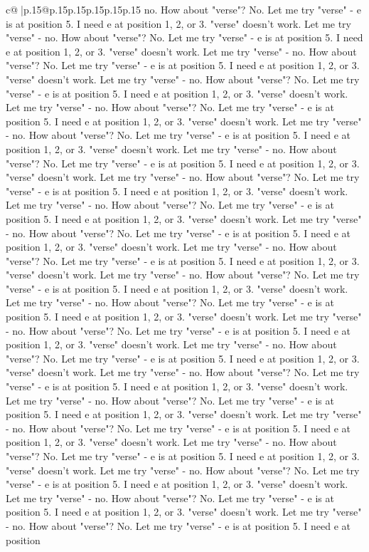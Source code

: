 \documentclass{article}
\begin{document}
{\begin{supertabular}{c@{$\;$}|p{.15\linewidth}@{}p{.15\linewidth}p{.15\linewidth}p{.15\linewidth}p{.15\linewidth}p{.15\linewidth}}
{{{no. How about "verse"? No. Let me try "verse" {-} e is at position 5. I need e at position 1, 2, or 3. "verse" doesn't work. Let me try "verse" {-} no. How about "verse"? No. Let me try "verse" {-} e is at position 5. I need e at position 1, 2, or 3. "verse" doesn't work. Let me try "verse" {-} no. How about "verse"? No. Let me try "verse" {-} e is at position 5. I need e at position 1, 2, or 3. "verse" doesn't work. Let me try "verse" {-} no. How about "verse"? No. Let me try "verse" {-} e is at position 5. I need e at position 1, 2, or 3. "verse" doesn't work. Let me try "verse" {-} no. How about "verse"? No. Let me try "verse" {-} e is at position 5. I need e at position 1, 2, or 3. "verse" doesn't work. Let me try "verse" {-} no. How about "verse"? No. Let me try "verse" {-} e is at position 5. I need e at position 1, 2, or 3. "verse" doesn't work. Let me try "verse" {-} no. How about "verse"? No. Let me try "verse" {-} e is at position 5. I need e at position 1, 2, or 3. "verse" doesn't work. Let me try "verse" {-} no. How about "verse"? No. Let me try "verse" {-} e is at position 5. I need e at position 1, 2, or 3. "verse" doesn't work. Let me try "verse" {-} no. How about "verse"? No. Let me try "verse" {-} e is at position 5. I need e at position 1, 2, or 3. "verse" doesn't work. Let me try "verse" {-} no. How about "verse"? No. Let me try "verse" {-} e is at position 5. I need e at position 1, 2, or 3. "verse" doesn't work. Let me try "verse" {-} no. How about "verse"? No. Let me try "verse" {-} e is at position 5. I need e at position 1, 2, or 3. "verse" doesn't work. Let me try "verse" {-} no. How about "verse"? No. Let me try "verse" {-} e is at position 5. I need e at position 1, 2, or 3. "verse" doesn't work. Let me try "verse" {-} no. How about "verse"? No. Let me try "verse" {-} e is at position 5. I need e at position 1, 2, or 3. "verse" doesn't work. Let me try "verse" {-} no. How about "verse"? No. Let me try "verse" {-} e is at position 5. I need e at position 1, 2, or 3. "verse" doesn't work. Let me try "verse" {-} no. How about "verse"? No. Let me try "verse" {-} e is at position 5. I need e at position 1, 2, or 3. "verse" doesn't work. Let me try "verse" {-} no. How about "verse"? No. Let me try "verse" {-} e is at position 5. I need e at position 1, 2, or 3. "verse" doesn't work. Let me try "verse" {-} no. How about "verse"? No. Let me try "verse" {-} e is at position 5. I need e at position 1, 2, or 3. "verse" doesn't work. Let me try "verse" {-} no. How about "verse"? No. Let me try "verse" {-} e is at position 5. I need e at position 1, 2, or 3. "verse" doesn't work. Let me try "verse" {-} no. How about "verse"? No. Let me try "verse" {-} e is at position 5. I need e at position 1, 2, or 3. "verse" doesn't work. Let me try "verse" {-} no. How about "verse"? No. Let me try "verse" {-} e is at position 5. I need e at position 1, 2, or 3. "verse" doesn't work. Let me try "verse" {-} no. How about "verse"? No. Let me try "verse" {-} e is at position 5. I need e at position 1, 2, or 3. "verse" doesn't work. Let me try "verse" {-} no. How about "verse"? No. Let me try "verse" {-} e is at position 5. I need e at position }}}
\end{supertabular}}
\end{document}
